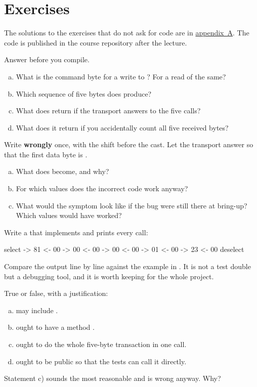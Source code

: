 \section*{Exercises}

The solutions to the exercises that do not ask for code are in
\hyperref[ch:losningar]{appendix~A}. The code is published in the course repository after the
lecture.

\label{ex:9:1}
Answer before you compile.
\begin{enumerate}[a)]
  \item What is the command byte for a write to ? For a read of the same?
  \item Which sequence of five bytes does  produce?
  \item What does  return if the transport answers  to the
    five  calls?
  \item What does it return if you accidentally count all five received bytes?
\end{enumerate}

\label{ex:9:2}
Write  \textbf{wrongly} once, with the shift before the cast. Let the transport
answer so that the first data byte is .
\begin{enumerate}[a)]
  \item What does  become, and why?
  \item For which values does the incorrect code work anyway?
  \item What would the symptom look like if the bug were still there at bring-up? Which 
    values would have worked?
\end{enumerate}

\label{ex:9:3}
Write a  that implements  and prints every call:
\begin{console}
select
  -> 81   <- 00
  -> 00   <- 00
  -> 00   <- 00
  -> 01   <- 00
  -> 23   <- 00
deselect
\end{console}
Compare the output line by line against the example in . It is not a test double
but a debugging tool, and it is worth keeping for the whole project.

\label{ex:9:4}
True or false, with a justification:
\begin{enumerate}[a)]
  \item {} may include .
  \item {} ought to have a method .
  \item {} ought to do the whole five-byte transaction in one call.
  \item {} ought to be public so that the tests can call it directly.
\end{enumerate}
Statement c) sounds the most reasonable and is wrong anyway. Why?
